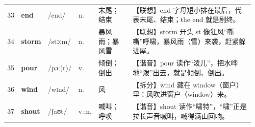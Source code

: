 \documentclass[UTF8,a4paper,11pt,oneside]{ctexbook}
\newcommand{\cellword}[1]{{\bfseries\textcolor{wordcol}{#1}}}
\newcommand{\cellipa}[1]{{\footnotesize\textcolor{ipacol}{#1}}}
\newcommand{\cellpos}[1]{\textcolor{poscol}{#1}}
\newcommand{\cellno}[1]{\textcolor{volcolor!75!black}{#1}}
\begin{document}
{\begin{longtable}{@{}C{0.045\textwidth}L{0.155\textwidth}L{0.175\textwidth}C{0.070\textwidth}L{0.180\textwidth}L{0.282\textwidth}@{}}
 \cellno{33} & \cellword{end} & \cellipa{/end/} & \cellpos{n.} & 末尾；结束 & \textcolor{tagAssoc}{【联想】}end 字母短小排在最后，代表末尾、结束；the end 就是剧终。 \\
\cellno{34} & \cellword{storm} & \cellipa{/stɔːm/} & \cellpos{n.} & 暴风雨；暴风雪 & \textcolor{tagAssoc}{【联想】}storm 开头 st 像狂风“嘶嘶”呼啸，暴风雨（雪）来袭，赶紧躲进屋。 \\
 \cellno{35} & \cellword{pour} & \cellipa{/pɔː(r)/} & \cellpos{v.} & 倾倒；倒出 & \textcolor{tagSound}{【谐音】}pour 读作“泼儿”，把水哗地“泼”出去，就是倾倒、倒出。 \\
\cellno{36} & \cellword{wind} & \cellipa{/wɪnd/} & \cellpos{n.} & 风 & \textcolor{tagSplit}{【拆分】}wind 藏在 window（窗户）里：风吹进窗户（window）来。 \\
 \cellno{37} & \cellword{shout} & \cellipa{/ʃaʊt/} & \cellpos{v.;\allowbreak{}n.} & 喊叫；呼唤 & \textcolor{tagSound}{【谐音】}shout 读作“啸特”，“啸”正是拉长声音喊叫，喊得满山回响。 \\
\end{longtable}
}

\end{document}
